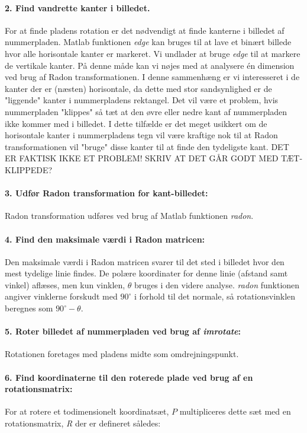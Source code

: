 \paragraph{2. Find vandrette kanter i billedet.}
For at finde pladens rotation er det nødvendigt at finde kanterne i billedet af nummerpladen. Matlab funktionen \textit{edge} kan bruges til at lave et binært billede hvor alle horisontale kanter er markeret. Vi undlader at bruge \textit{edge} til at markere de vertikale kanter. På denne måde kan vi nøjes med at analysere én dimension ved brug af Radon transformationen. I denne sammenhæng er vi interesseret i de kanter der er (næsten) horisontale, da dette med stor sandsynlighed er de "liggende" kanter i nummerpladens rektangel. Det vil være et problem, hvis nummerpladen "klippes" så tæt at den øvre eller nedre kant af nummerpladen ikke kommer med i billedet. I dette tilfælde er det meget usikkert om de horisontale kanter i nummerpladens tegn vil være kraftige nok til at Radon transformationen vil "bruge" disse kanter til at finde den tydeligste kant. DET ER FAKTISK IKKE ET PROBLEM! SKRIV AT DET GÅR GODT MED TÆT-KLIPPEDE?

\paragraph{3. Udfør Radon transformation for kant-billedet:} Radon transformation udføres ved brug af Matlab funktionen \textit{radon}.

\paragraph{4. Find den maksimale værdi i Radon matricen:} Den maksimale værdi i Radon matricen svarer til det sted i billedet hvor den mest tydelige linie findes. De polære koordinater for denne linie (afstand samt vinkel) aflæses, men kun vinklen, $\theta$ bruges i den videre analyse. \textit{radon} funktionen angiver vinklerne forskudt med $90^{\circ}$ i forhold til det normale, så rotationsvinklen beregnes som $90^{\circ} - \theta$.

\paragraph{5. Roter billedet af nummerpladen ved brug af \textit{imrotate}:} Rotationen foretages med pladens midte som omdrejningspunkt.

\paragraph{6. Find koordinaterne til den roterede plade ved brug af en rotationsmatrix:} For at rotere et todimensionelt koordinatsæt, $P$ multipliceres dette sæt med en rotationsmatrix, \textit{R} der er defineret således:

